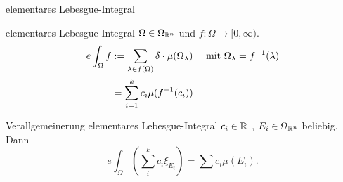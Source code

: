 \documentclass[class=article, crop=false]{standalone}
\begin{document}
\begin{zettel}{elementares Lebesgue-Integral}
\begin{flashcard}[e3tf5t7v]{elementares Lebesgue-Integral}
	$\Omega \in  \Omega_{\mathbb{R}^n}$ und $f: \Omega \to  [0, \infty)$.
	\begin{align*}
		e \int_{\Omega} f & := \sum_{\lambda \in  f(\Omega)} \delta \cdot \mu(\Omega_\lambda ) \quad \text{ mit } \Omega_{\lambda} = f^{-1}(\lambda) \\
		                  & = \sum_{i = 1}^{k} c_i \mu ( f^{-1}(c_i))
	\end{align*}
\end{flashcard}

\begin{flashcard}[1rwb09r5]{Verallgemeinerung elementares Lebesgue-Integral}
	$c_i \in  \mathbb{R} $ , $E_i \in  \Omega_{\mathbb{R}^n}$ beliebig. Dann
	\[
		e \int_{\Omega} \left(\sum_{i}^{k} c_i \xi_{E_i}\right) = \sum c_i \mu(E_i)
	.\]
\end{flashcard}

\begin{lemma}
\end{lemma}

\end{zettel}
\end{document}
